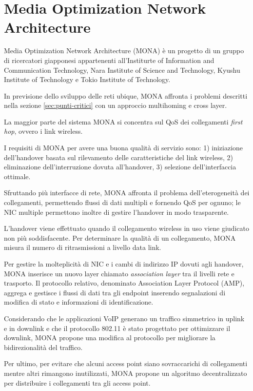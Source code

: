 \documentclass[12pt,a4paper,openright,twoside]{book}
\begin{document}
\clearpage{\pagestyle{empty}\cleardoublepage}


\chapter{Media Optimization Network Architecture}
\label{cha:mona}
Media Optimization Network Architecture (MONA) è un progetto di un
gruppo di ricercatori giapponesi appartenenti all'Institurte of
Information and Communication Technology, Nara Institute of Science
and Technology, Kyushu Institute of Technology e Tokio Institute of
Technology.

In previsione dello sviluppo delle reti ubique, MONA affronta i
problemi descritti nella sezione \ref{sec:punti-critici} con un
approccio multihoming e cross layer.

La maggior parte del sistema MONA si concentra sul QoS dei
collegamenti \emph{first hop}, ovvero i link wireless.

I requisiti di MONA per avere una buona qualità di servizio sono:
1) iniziazione dell'handover basata sul rilevamento delle
caratteristiche del link wireless, 2) eliminazione dell'interruzione
dovuta all'handover, 3) selezione dell'interfaccia ottimale.

Sfruttando più interfacce di rete, MONA affronta il problema
dell'eterogeneità dei collegamenti, permettendo flussi di dati
multipli e fornendo QoS per ognuno; le NIC multiple permettono inoltre
di gestire l'handover in modo trasparente.

L'handover viene effettuato quando il collegamento wireless in uso
viene giudicato non più soddisfacente. Per determinare la qualità di
un collegamento, MONA misura il numero di ritrasmissioni a livello
data link.

Per gestire la molteplicità di NIC e i cambi di indirizzo IP dovuti
agli handover, MONA inserisce un nuovo layer chiamato
\emph{association layer} tra il livelli rete e trasporto. Il
protocollo relativo, denominato Association Layer Protocol (AMP),
aggrega e gestisce i flussi di dati tra gli endpoint inserendo
segnalazioni di modifica di stato e informazioni di identificazione.

Considerando che le applicazioni VoIP generano un traffico simmetrico
in uplink e in downlink e che il protocollo 802.11 è stato progettato
per ottimizzare il downlink, MONA propone una modifica al protocollo
per migliorare la bidirezionalità del traffico.

Per ultimo, per evitare che alcuni access point siano sovraccarichi di
collegamenti mentre altri rimangono inutilizzati, MONA propone un
algoritmo decentralizzato per distribuire i collegamenti tra gli
access point.
\end{document}
